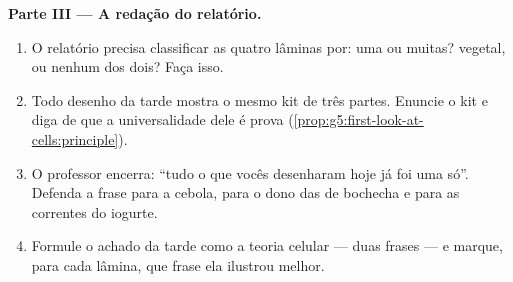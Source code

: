 \begin{problem}
\medskip\noindent\textbf{Parte III --- A redação do relatório.}
\begin{enumerate}[resume]
  \item O relatório precisa classificar as quatro lâminas por: uma
         ou muitas? vegetal,  ou nenhum dos dois? Faça
        isso.
  \item Todo desenho da tarde mostra o mesmo kit de três partes.
        Enuncie o kit e diga de que a universalidade dele é prova
        (\cref{prop:g5:first-look-at-cells:principle}).
  \item O professor encerra: ``tudo o que vocês desenharam hoje já
        foi uma  só''. Defenda a frase para a cebola, para o
        dono das  de bochecha e para as correntes do iogurte.
  \item Formule o achado da tarde como a teoria celular --- duas
        frases --- e marque, para cada lâmina, que frase ela ilustrou
        melhor.
\end{enumerate}
\end{problem}

